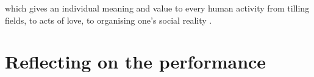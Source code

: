 which gives an individual meaning and value to every human activity from tilling fields, to acts of love, to organising one's social reality \cite{marx_economic_1844, mitchell_i_2013}.


\section{Reflecting on the performance}

